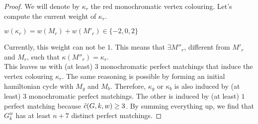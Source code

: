 \begin{proof}
    We will denote by $\kappa_r$ the red monochromatic vertex colouring.
    Let's compute the current weight of $\kappa_r$.
    \begin{center}
        $w(\kappa_r) = w(M_r) + w(M'_r) \in \{-2, 0, 2\}$
    \end{center}
    Currently, this weight can not be $1$.
    This means that $\exists M''_r$, different from $M'_r$ and $M_r$, such that $\kappa(M''_r) = \kappa_r$.\\

    This leaves us with (at least) $3$ monochromatic perfect matchings that induce the vertex colouring $\kappa_r$.
    The same reasoning is possible by forming an initial hamiltonian cycle with $M_g$ and $M_b$.
    Therefore, $\kappa_g$ or $\kappa_b$ is also induced by (at least) $3$ monochromatic perfect matchings.
    The other is induced by (at least) $1$ perfect matching because $\Tilde{c}(G, k, w) \geq 3$.
    By summing everything up, we find that $G_k^w$ has at least $n + 7$ distinct perfect matchings.

\end{proof}
